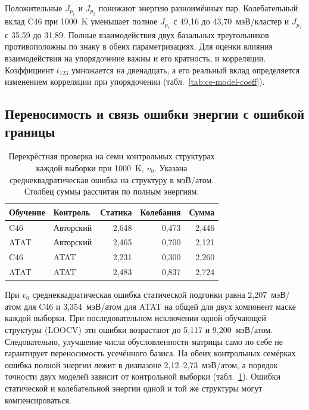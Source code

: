 Положительные \(J_{p_1}\) и \(J_{p_2}\) понижают энергию разноимённых
пар. Колебательный вклад C46 при 1000~K уменьшает полное \(J_{p_1}\)
с 49,16 до 43,70~мэВ/кластер и \(J_{p_2}\) с 35,59 до 31,89.
Полные взаимодействия двух базальных треугольников противоположны
по знаку в обеих параметризациях. Для оценки влияния
взаимодействия на упорядочение важны и его кратность, и корреляции. Коэффициент
\(t_{123}\) умножается на двенадцать, а его реальный вклад определяется
изменением корреляции при упорядочении (табл.~\ref{tab:ce-model-coeff}).

\subsection{Переносимость и связь ошибки энергии с ошибкой границы}

\begin{table}[htbp]
\centering\small
\caption{Перекрёстная проверка на семи контрольных структурах каждой
выборки при 1000~K, \(v_0\). Указана среднеквадратическая ошибка
на структуру в мэВ/атом. Столбец суммы рассчитан по полным энергиям.}
\label{tab:ce-model-transfer}
\begin{tabular}{llrrr}
\toprule
Обучение & Контроль & Статика & Колебания & Сумма\\
\midrule
C46  & Авторский & 2,648 & 0,473 & 2,446\\
ATAT & Авторский & 2,465 & 0,700 & 2,121\\
C46  & ATAT      & 2,231 & 0,300 & 2,260\\
ATAT & ATAT      & 2,483 & 0,837 & 2,724\\
\bottomrule
\end{tabular}
\end{table}

При \(v_0\) среднеквадратическая ошибка статической подгонки равна
2,207~мэВ/атом для C46 и 3,354~мэВ/атом для ATAT на общей для двух
компонент маске каждой выборки. При последовательном исключении одной
обучающей структуры (LOOCV) эти ошибки возрастают до 5,117 и
9,200~мэВ/атом. Следовательно, улучшение числа обусловленности матрицы
само по себе не гарантирует переносимость усечённого базиса. На обеих
контрольных семёрках ошибка полной энергии лежит в диапазоне
2,12--2,73~мэВ/атом, а порядок точности двух моделей зависит от
контрольной выборки (табл.~\ref{tab:ce-model-transfer}). Ошибки
статической и колебательной энергии одной и той же структуры могут
компенсироваться.

